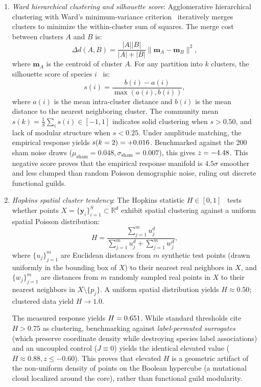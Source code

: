 \documentclass[11pt,a4paper]{article}
\begin{document}
\begin{enumerate}[label=(\alph*)]
\item \textit{Ward hierarchical clustering and silhouette score}: Agglomerative hierarchical clustering with Ward's minimum-variance criterion~\cite{ward1963hierarchical} iteratively merges clusters to minimize the within-cluster sum of squares. The merge cost between clusters $A$ and $B$ is:
\begin{equation}
\Delta d(A, B) = \frac{|A| |B|}{|A| + |B|} \|\mathbf{m}_A - \mathbf{m}_B\|^2,
\end{equation}
where $\mathbf{m}_A$ is the centroid of cluster $A$. For any partition into $k$ clusters, the silhouette score of species $i$~\cite{rousseeuw1987silhouettes} is:
\begin{equation}
s(i) = \frac{b(i) - a(i)}{\max(a(i), b(i))},
\end{equation}
where $a(i)$ is the mean intra-cluster distance and $b(i)$ is the mean distance to the nearest neighboring cluster. The community mean $s(k) = \frac{1}{S} \sum_i s(i) \in [-1, 1]$ indicates solid clustering when $s > 0.50$, and lack of modular structure when $s < 0.25$. Under amplitude matching, the empirical response yields $s(k=2) = +0.016$. Benchmarked against the 200 sham noise draws ($\mu_{\mathrm{sham}} = 0.048, \sigma_{\mathrm{sham}} = 0.007$), this gives $z = -4.48$. This negative score proves that the empirical response manifold is $4.5\sigma$ smoother and less clumped than random Poisson demographic noise, ruling out discrete functional guilds.

\item \textit{Hopkins spatial cluster tendency}: The Hopkins statistic $H \in [0, 1]$~\cite{hopkins1954new} tests whether points $X = \{\mathbf{y}_i\}_{i=1}^S \subset \mathbb{R}^d$ exhibit spatial clustering against a uniform spatial Poisson distribution:
\begin{equation}
H = \frac{\sum_{j=1}^m u_j^d}{\sum_{j=1}^m u_j^d + \sum_{j=1}^m w_j^d},
\label{eq:hopkins_def_supp2}
\end{equation}
where $\{u_j\}_{j=1}^m$ are Euclidean distances from $m$ synthetic test points (drawn uniformly in the bounding box of $X$) to their nearest real neighbors in $X$, and $\{w_j\}_{j=1}^m$ are distances from $m$ randomly sampled real points in $X$ to their nearest neighbors in $X \setminus \{p_j\}$. A uniform spatial distribution yields $H \approx 0.50$; clustered data yield $H \to 1.0$.

The measured response yields $H = 0.651$. While standard thresholds cite $H > 0.75$ as clustering, benchmarking against \emph{label-permuted surrogates} (which preserve coordinate density while destroying species label associations) and an uncoupled control ($J \equiv 0$) yields the identical elevated value ($H \approx 0.88, z \le -0.60$). This proves that elevated $H$ is a geometric artifact of the non-uniform density of points on the Boolean hypercube (a mutational cloud localized around the core), rather than functional guild modularity.


\end{enumerate}
\end{document}
